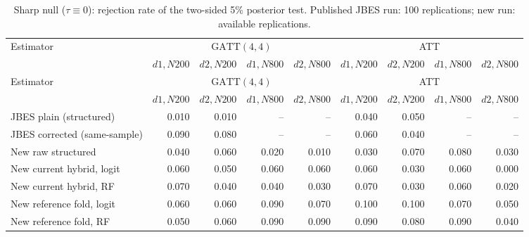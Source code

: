 {\footnotesize\setlength{\tabcolsep}{3pt}
\begin{longtable}{lrrrrrrrr}
\caption{Sharp null ($\tau\equiv 0$): rejection rate of the two-sided 5\% posterior test. Published JBES run: 100 replications; new run: available replications.}\label{tab:null}\\
\toprule
Estimator & \multicolumn{4}{c}{$\mathrm{GATT}(4,4)$} & \multicolumn{4}{c}{ATT} \\
\cmidrule(lr){2-5}\cmidrule(lr){6-9}
 & $d1,N200$ & $d2,N200$ & $d1,N800$ & $d2,N800$ & $d1,N200$ & $d2,N200$ & $d1,N800$ & $d2,N800$ \\
\midrule
\endfirsthead
\toprule
Estimator & \multicolumn{4}{c}{$\mathrm{GATT}(4,4)$} & \multicolumn{4}{c}{ATT} \\
\cmidrule(lr){2-5}\cmidrule(lr){6-9}
 & $d1,N200$ & $d2,N200$ & $d1,N800$ & $d2,N800$ & $d1,N200$ & $d2,N200$ & $d1,N800$ & $d2,N800$ \\
\midrule
\endhead
\bottomrule
\endlastfoot
JBES plain (structured) & 0.010 & 0.010 & -- & -- & 0.040 & 0.050 & -- & -- \\
JBES corrected (same-sample) & 0.090 & 0.080 & -- & -- & 0.060 & 0.040 & -- & -- \\
New raw structured & 0.040 & 0.060 & 0.020 & 0.010 & 0.030 & 0.070 & 0.080 & 0.030 \\
New current hybrid, logit & 0.060 & 0.050 & 0.060 & 0.060 & 0.060 & 0.030 & 0.060 & 0.000 \\
New current hybrid, RF & 0.070 & 0.040 & 0.040 & 0.030 & 0.070 & 0.030 & 0.060 & 0.020 \\
New reference fold, logit & 0.060 & 0.060 & 0.090 & 0.070 & 0.100 & 0.100 & 0.070 & 0.050 \\
New reference fold, RF & 0.050 & 0.060 & 0.090 & 0.090 & 0.090 & 0.080 & 0.090 & 0.040 \\
\end{longtable}
}
